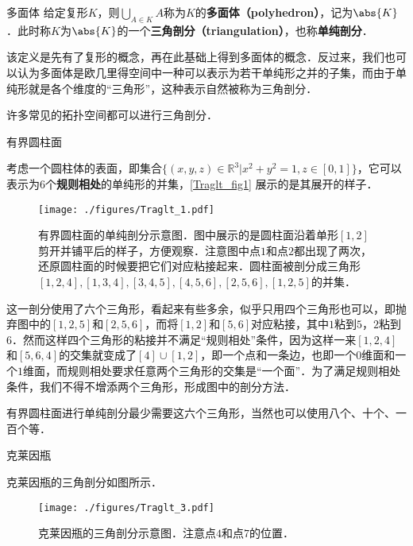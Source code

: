 

\begin{definition}{多面体}
给定复形$K$，则$\bigcup\limits_{A\in K}A$称为$K$的\textbf{多面体（polyhedron）}，记为$\abs{K}$．此时称$K$为$\abs{K}$的一个\textbf{三角剖分（triangulation）}，也称\textbf{单纯剖分}．
\end{definition}

该定义是先有了复形的概念，再在此基础上得到多面体的概念．反过来，我们也可以认为多面体是欧几里得空间中一种可以表示为若干单纯形之并的子集，而由于单纯形就是各个维度的“三角形”，这种表示自然被称为三角剖分．

许多常见的拓扑空间都可以进行三角剖分．

\begin{example}{有界圆柱面}

考虑一个圆柱体的表面，即集合$\{(x, y, z)\in\mathbb{R}^3|x^2+y^2=1, z\in [0, 1]\}$，它可以表示为$6$个\textbf{规则相处}的单纯形的并集，\autoref{Traglt_fig1} 展示的是其展开的样子．


\begin{figure}[ht]
\centering
\texttt{[image: ./figures/Traglt\_1.pdf]}
\caption{有界圆柱面的单纯剖分示意图．图中展示的是圆柱面沿着单形$[1, 2]$剪开并铺平后的样子，方便观察．注意图中点$1$和点$2$都出现了两次，还原圆柱面的时候要把它们对应粘接起来．圆柱面被剖分成三角形$[1,2,4], [1,3,4], [3,4,5], [4,5,6], [2,5,6], [1,2,5]$的并集．} \label{Traglt_fig1}
\end{figure}


这一剖分使用了六个三角形，看起来有些多余，似乎只用四个三角形也可以，即抛弃图中的$[1,2,5]$和$[2,5,6]$，而将$[1, 2]$和$[5, 6]$对应粘接，其中$1$粘到$5$，$2$粘到$6$．然而这样四个三角形的粘接并不满足“规则相处”条件，因为这样一来$[1, 2, 4]$和$[5, 6, 4]$的交集就变成了$[4]\cup[1, 2]$，即一个点和一条边，也即一个$0$维面和一个$1$维面，而规则相处要求任意两个三角形的交集是“一个面”．为了满足规则相处条件，我们不得不增添两个三角形，形成图中的剖分方法．



有界圆柱面进行单纯剖分最少需要这六个三角形，当然也可以使用八个、十个、一百个等．

\end{example}


\begin{example}{克莱因瓶}

克莱因瓶的三角剖分如图所示．

\begin{figure}[ht]
\centering
\texttt{[image: ./figures/Traglt\_3.pdf]}
\caption{克莱因瓶的三角剖分示意图．注意点$4$和点$7$的位置．} \label{Traglt_fig3}
\end{figure}

\end{example}



